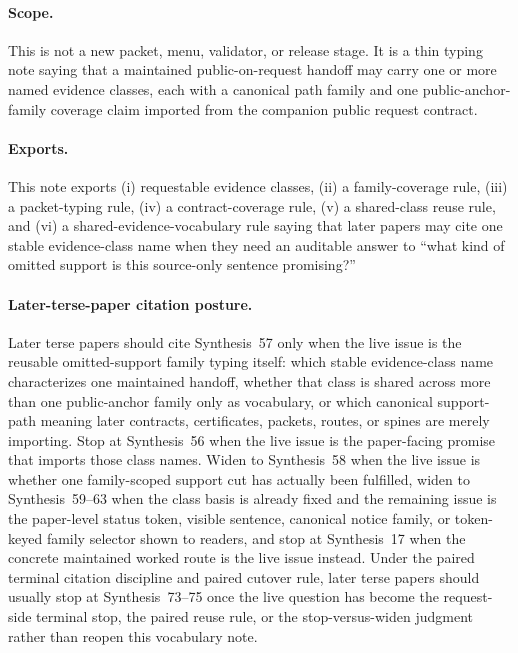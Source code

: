 \documentclass[11pt]{article}
\begin{document}
\paragraph{Scope.}
This is not a new packet, menu, validator, or release stage.
It is a thin typing note saying that a maintained public-on-request handoff may carry one or more named evidence classes, each with a canonical path family and one public-anchor-family coverage claim imported from the companion public request contract.

\paragraph{Exports.}
This note exports (i) requestable evidence classes, (ii) a family-coverage rule, (iii) a packet-typing rule, (iv) a contract-coverage rule, (v) a shared-class reuse rule, and (vi) a shared-evidence-vocabulary rule saying that later papers may cite one stable evidence-class name when they need an auditable answer to ``what kind of omitted support is this source-only sentence promising?''

\paragraph{Later-terse-paper citation posture.}
Later terse papers should cite Synthesis~57 only when the live issue is the reusable omitted-support family typing itself: which stable evidence-class name characterizes one maintained handoff, whether that class is shared across more than one public-anchor family only as vocabulary, or which canonical support-path meaning later contracts, certificates, packets, routes, or spines are merely importing. Stop at Synthesis~56 when the live issue is the paper-facing promise that imports those class names. Widen to Synthesis~58 when the live issue is whether one family-scoped support cut has actually been fulfilled, widen to Synthesis~59--63 when the class basis is already fixed and the remaining issue is the paper-level status token, visible sentence, canonical notice family, or token-keyed family selector shown to readers, and stop at Synthesis~17 when the concrete maintained worked route is the live issue instead. Under the paired terminal citation discipline and paired cutover rule, later terse papers should usually stop at Synthesis~73--75 once the live question has become the request-side terminal stop, the paired reuse rule, or the stop-versus-widen judgment rather than reopen this vocabulary note.\cite{series:publicrequestcontracts,series:requestfulfillmentcertificates,series:publicrequeststatusenvelopes,series:publicrequestcarryforward,series:publicrequestnotices,series:publicrequestnoticenormalforms,series:publicrequestnoticeselections,series:requestsideterminalcitationnormalform,series:pairedterminalcitationdiscipline,series:pairedterminalcutoverrules,series:workedexample}
\end{document}

